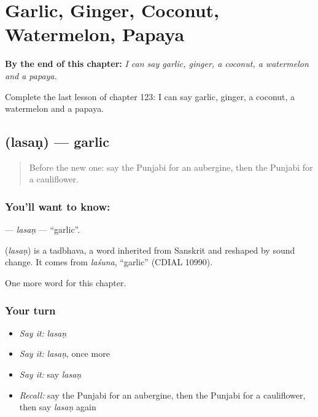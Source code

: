 
\chapter{Garlic, Ginger, Coconut, Watermelon, Papaya}
\label{ch:pa-garlic-ginger-coconut-watermelon-papaya}

\begin{chapteropening}
\textbf{By the end of this chapter:} \emph{I can say garlic, ginger, a coconut, a watermelon and a papaya.}

Complete the last lesson of chapter 123: I can say garlic, ginger, a coconut, a watermelon and a papaya.
\end{chapteropening}

\section[\texorpdfstring{\pa{ਲਸਣ} (lasaṇ)}{ਲਸਣ (lasaṇ)}]{ (lasaṇ) — garlic}

\label{lesson:PA-C123-lasan}



\begin{quote}
Before the new one: say the Punjabi for an aubergine, then the Punjabi for a cauliflower.
\end{quote}

\subsection*{You'll want to know: }
\textbf{} — \emph{lasaṇ} — \textquotedblleft{}garlic\textquotedblright{}.

\begin{cousinweb}
\textbf{} (\emph{lasaṇ}) is a tadbhava, a word inherited from Sanskrit and reshaped by sound change. It comes from \emph{laśuna}, \textquotedblleft{}garlic\textquotedblright{} (CDIAL 10990).
\end{cousinweb}

\begin{grammarlens}[title={What you've built}]
One more word for this chapter.
\end{grammarlens}

\subsection*{Your turn}
\begin{itemize}
\raggedright
  \item \emph{Say it:} \emph{lasaṇ}
  \item \emph{Say it:} \emph{lasaṇ}, once more
  \item \emph{Say it:} say \emph{lasaṇ}
  \item \emph{Recall:} say the Punjabi for an aubergine, then the Punjabi for a cauliflower, then say \emph{lasaṇ} again
\end{itemize}


